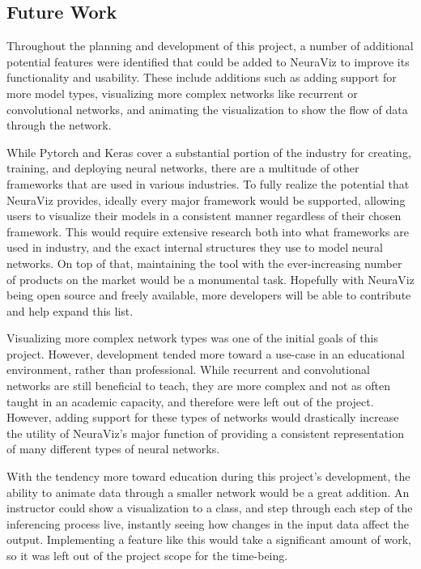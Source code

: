 \subsection{Future Work}
Throughout the planning and development of this project, a number of additional potential features were identified that could be added to NeuraViz to improve its functionality and usability. These include additions such as adding support for more model types, visualizing more complex networks like recurrent or convolutional networks, and animating the visualization to show the flow of data through the network.

While Pytorch and Keras cover a substantial portion of the industry for creating, training, and deploying neural networks, there are a multitude of other frameworks that are used in various industries. To fully realize the potential that NeuraViz provides, ideally every major framework would be supported, allowing users to visualize their models in a consistent manner regardless of their chosen framework. This would require extensive research both into what frameworks are used in industry, and the exact internal structures they use to model neural networks. On top of that, maintaining the tool with the ever-increasing number of products on the market would be a monumental task. Hopefully with NeuraViz being open source and freely available, more developers will be able to contribute and help expand this list. 

Visualizing more complex network types was one of the initial goals of this project. However, development tended more toward a use-case in an educational environment, rather than professional. While recurrent and convolutional networks are still beneficial to teach, they are more complex and not as often taught in an academic capacity, and therefore were left out of the project. However, adding support for these types of networks would drastically increase the utility of NeuraViz's major function of providing a consistent representation of many different types of neural networks. 

With the tendency more toward education during this project's development, the ability to animate data through a smaller network would be a great addition. An instructor could show a visualization to a class, and step through each step of the inferencing process live, instantly seeing how changes in the input data affect the output. Implementing a feature like this would take a significant amount of work, so it was left out of the project scope for the time-being.